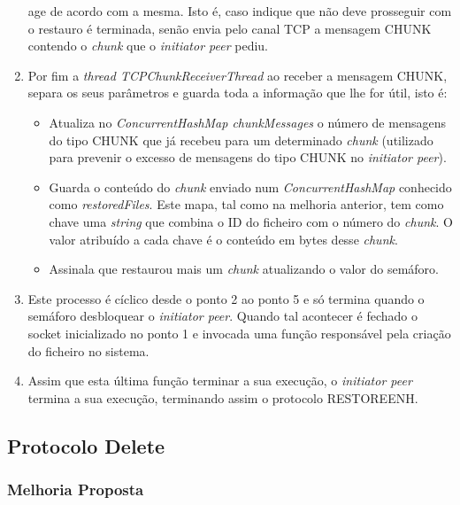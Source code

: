 \documentclass[11pt,oneside]{book}
\begin{document}
\begin{enumerate}
        age de acordo com a mesma. Isto é, caso indique que não deve prosseguir
        com o restauro é terminada, senão envia pelo canal TCP a mensagem CHUNK
        contendo o \textit{chunk} que o \textit{initiator peer} pediu.
        \item Por fim a \textit{thread TCPChunkReceiverThread} ao receber a mensagem
        CHUNK, separa os seus parâmetros e guarda toda a informação que lhe for útil,
        isto é:
        \begin{itemize}
            \item Atualiza no \textit{ConcurrentHashMap chunkMessages} o número
            de mensagens do tipo CHUNK que já recebeu para um determinado \textit{chunk}
            (utilizado para prevenir o excesso de mensagens do tipo CHUNK no 
            \textit{initiator peer}).
            \item Guarda o conteúdo do \textit{chunk} enviado num \textit{ConcurrentHashMap} conhecido
            como \textit{restoredFiles}. Este mapa, tal como na melhoria anterior, 
            tem como chave uma \textit{string} que combina o ID do ficheiro com
            o número do \textit{chunk}. O valor atribuído a cada chave é o 
            conteúdo em bytes desse \textit{chunk}.
            \item Assinala que restaurou mais um \textit{chunk} atualizando o 
            valor do semáforo.
        \end{itemize}
        \item Este processo é cíclico desde o ponto 2 ao ponto 5 e só termina quando
        o semáforo desbloquear o \textit{initiator peer}. Quando tal acontecer é
        fechado o socket inicializado no ponto 1 e invocada uma função responsável
        pela criação do ficheiro no sistema.
        \item Assim que esta última função terminar a sua execução, o 
        \textit{initiator peer} termina a sua execução, terminando assim o protocolo
        RESTOREENH.
    \end{enumerate}



\pagebreak

\subsection{Protocolo Delete}

\subsubsection{Melhoria Proposta}
\end{document}

